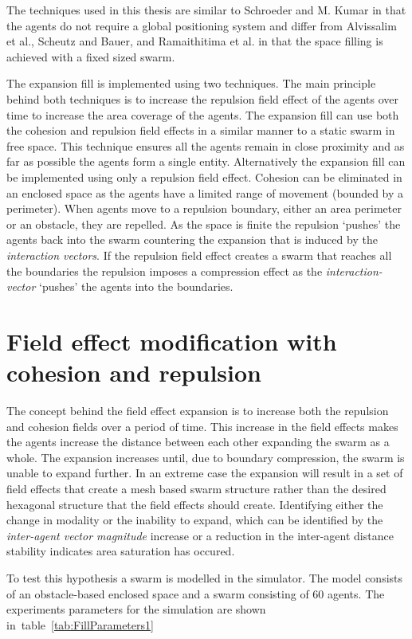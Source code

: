 The techniques used in this thesis are similar to Schroeder and M. Kumar in that the agents do not require a global positioning system and differ from Alvissalim et al., Scheutz and Bauer, and Ramaithitima et al. in that the space filling is achieved with a fixed sized swarm. 

The expansion fill is implemented using two techniques. The main principle behind both techniques is to increase the repulsion field effect of the agents over time to increase the area coverage of the agents. The expansion fill can use both the cohesion and repulsion field effects in a similar manner to a static swarm in free space. This technique ensures all the agents remain in close proximity and as far as possible the agents form a single entity. Alternatively the expansion fill can be implemented using only a repulsion field effect. Cohesion can be eliminated in an enclosed space as the agents have a limited range of movement (bounded by a perimeter). When agents move to a repulsion boundary, either an area perimeter or an obstacle, they are repelled. As the space is finite the repulsion `pushes' the agents back into the swarm countering the expansion that is induced by the \textit{interaction vectors}. If the repulsion field effect creates a swarm that reaches all the boundaries the repulsion imposes a compression effect as the \textit{interaction-vector} `pushes' the agents into the boundaries. 

\section{Field effect modification with cohesion and repulsion}
The concept behind the field effect expansion is to increase both the repulsion and cohesion fields over a period of time. This increase in the field effects makes the agents increase the distance between each other expanding the swarm as a whole. The expansion increases until, due to boundary compression, the swarm is unable to expand further. In an extreme case the expansion will result in a set of field effects that create a mesh based swarm structure rather than the desired hexagonal structure that the field effects should create. Identifying either the change in modality or the inability to expand, which can be identified by the \textit{inter-agent vector magnitude} increase or a reduction in the inter-agent distance stability indicates area saturation has occured.

To test this hypothesis a swarm is modelled in the simulator. The model consists of an obstacle-based enclosed space and a swarm consisting of 60 agents. The experiments parameters for the simulation are shown in~table~\ref{tab:FillParameters1}

